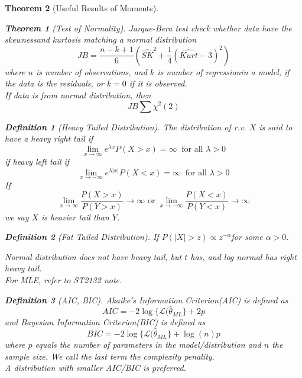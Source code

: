 \documentclass[11pt]{article}
\newtheorem{definition}{Definition}[section]
\newtheorem{theorem}{Theorem}[section]
\theoremstyle{definition}
\begin{document}
\begin{theorem}[Useful Results of Moments]
\begin{theorem}[Test of Normality]
\normalfont Jarque-Bera test check whether data have the skewnessand kurtosis matching a normal distribution
\[
JB=\frac{n-k+1}{6}(\hat{SK}^2+\frac{1}{4}(\hat{Kurt}-3)^2)
\]
where $n$ is number of observations, and $k$ is number of regressionin a model, if the data is the residuals, or $k = 0$ if it is observed.\\
If data is from normal distribution, then 
\[
JB\sum\chi^2(2)
\]
\end{theorem}
\begin{definition}[Heavy Tailed Distribution]
\normalfont The distribution of r.v. $X$ is said to have a heavy right tail if
\[
\lim_{x\to\infty}e^{\lambda x}P(X>x)=\infty \;\;\text{for all }\lambda>0
\]
if heavy left tail if
\[
\lim_{x\to-\infty}e^{\lambda|x|}P(X<x)=\infty \;\;\text{for all }\lambda>0
\]
If
\[
\lim_{x\to\infty}\frac{P(X>x)}{P(Y>x)}\to\infty\text{ or }\lim_{x\to-\infty}\frac{P(X<x)}{P(Y<x)}\to\infty
\]
we say $X$ is heavier tail than $Y$.
\end{definition}
\begin{definition}[Fat Tailed Distribution]
\normalfont If $P(|X|>z)\propto z^{-\alpha}$for some $\alpha>0$.
\end{definition}

Normal distribution does not have heavy tail, but $t$ has, and log normal has right heavy tail.\\
For MLE, refer to ST2132 note.
\begin{definition}[AIC, BIC]
\normalfont 
Akaike's Information Criterion(AIC) is defined as
\[
AIC=-2\log\{\mathcal{L}(\hat{\theta}_{ML}\}+ 2p
\]
and Bayesian Information Criterion(BIC) is defined as
\[
BIC=-2\log\{\mathcal{L}(\hat{\theta}_{ML}\} + \log(n)p
\]
where $p$ equals the number of parameters in the model/distribution and $n$ the sample size. We call the last term the complexity penality.\\
A distribution with smaller AIC/BIC is preferred.
\end{definition}

\end{theorem}
\end{document}
